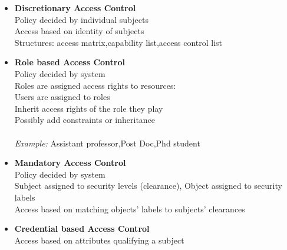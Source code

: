 \documentclass[10pt,a4paper]{book}
\begin{document}
\begin{itemize}
\item \textbf{Discretionary Access Control}\\
Policy decided by individual subjects\\
Access based on identity of subjects\\
Structures: access matrix,capability list,access control list
\item \textbf{Role based Access Control}\\
Policy decided by system\\
Roles are assigned access rights to resources:\\
Users are assigned to roles\\
Inherit access rights of the role they play\\
Possibly add constraints or inheritance\\\\
\emph{Example:} Assistant professor,Post Doc,Phd student
\item \textbf{Mandatory Access Control}\\
Policy decided by system\\
Subject assigned to security levels (clearance), Object assigned to security labels\\
Access based on matching objects' labels to subjects' clearances
\item \textbf{Credential based Access Control}\\
Access based on attributes qualifying a subject
\end{itemize}
\end{document}
